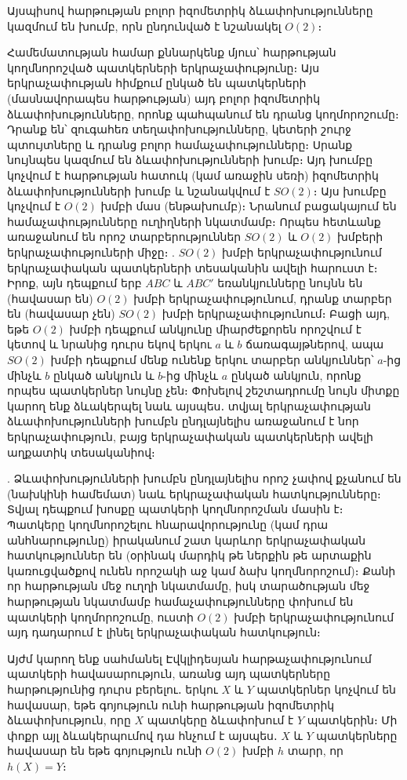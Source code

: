 \documentclass[./main.tex]{subfiles}
\begin{document}
\par Այսպիսով հարթության բոլոր իզոմետրիկ ձևափոխությունները կազմում են խումբ, որն ընդունված է նշանակել $O(2)$։

\par Համեմատության համար քննարկենք մյուս՝ հարթության կողմնորոշված պատկերների երկրաչափությունը։ Այս երկրաչափության
հիմքում ընկած են պատկերների (մասնավորապես հարթության) այդ բոլոր իզոմետրիկ ձևափոխությունները, որոնք պահպանում են դրանց կողմորոշումը։ Դրանք են՝ 
զուգահեռ տեղափոխությունները, կետերի շուրջ պտույտները և դրանց բոլոր համաչափությունները։ Սրանք նույնպես կազմում են ձևափոխությունների խումբ։ 
Այդ խումբը կոչվում է հարթության հատուկ (կամ առաջին սեռի) իզոմետրիկ ձևափոխությունների խումբ և նշանակվում է $SO(2)$։ Այս խումբը կոչվում է $O(2)$ խմբի մաս (ենթախումբ)։ Նրանում բացակայում են համաչափությունները ուղիղների նկատմամբ։ Որպես հետևանք առաջանում են
որոշ տարբերություններ $SO(2)$ և $O(2)$ խմբերի երկրաչափություների միջը։ 
. $SO(2)$ խմբի երկրաչափությունում երկրաչափական պատկերների տեսականին ավելի հարուստ է։ Իրոք, այն դեպքում երբ $ABC$ և $ABC'$ եռանկյունները նույնն են (հավասար են)
$O(2)$ խմբի երկրաչափությունում, դրանք տարբեր են (հավասար չեն) $SO(2)$ խմբի երկրաչափությունում։ Բացի այդ, եթե $O(2)$ խմբի դեպքում անկյունը միարժեքորեն որոշվում է
կետով և նրանից դուրս եկով երկու $a$ և $b$ ճառագայթներով, ապա $SO(2)$ խմբի դեպքում մենք ունենք երկու տարբեր անկյուններ՝ $a$-ից մինչև $b$ ընկած անկյուն և 
$b$-ից մինչև $a$ ընկած անկյուն, որոնք որպես պատկերներ նույնը չեն։ Փոխելով շեշտադրումը նույն միտքը կարող ենք ձևակերպել նաև այսպես․ տվյալ երկրաչափության 
ձևափոխությունների խումբն ընդլայնելիս առաջանում է նոր երկրաչափություն, բայց երկրաչափական պատկերների ավելի աղքատիկ տեսականիով։

. Ձևափոխությունների խումբն ընդլայնելիս որոշ չափով քչանում են (նախկինի համեմատ) նաև երկրաչափական հատկությունները։ Տվյալ դեպքում խոսքը պատկերի 
կողմնորոշման մասին է։ Պատկերը կողմնորոշելու հնարավորությունը (կամ դրա անհնարությունը) իրականում շատ կարևոր երկրաչափական հատկություններ են (օրինակ մարդիկ 
թե ներքին թե արտաքին կառուցվածքով ունեն որոշակի աջ կամ ձախ կողմնորոշում)։ Քանի որ հարթության մեջ ուղղի նկատմամը, իսկ տարածության մեջ հարթության նկատմամբ 
համաչափությունները փոխում են պատկերի կողմորոշումը, ուստի $O(2)$ խմբի երկրաչափությունում այդ դադարում է լինել երկրաչափական հատկություն։  


\par Այժմ կարող ենք սահմանել Էվկլիդեսյան հարթաչափությունում պատկերի հավասարություն, առանց այդ պատկերները 
հարթությունից դուրս բերելու․ երկու $X$ և $Y$ պատկերներ կոչվում են հավասար, եթե գոյություն ունի հարթության իզոմետրիկ ձևափոխություն, որը $X$ պատկերը 
ձևափոխում է $Y$ պատկերին։ Մի փոքր այլ ձևակերպումով դա հնչում է այսպես․ $X$ և $Y$ պատկերները հավասար են եթե գոյություն ունի $O(2)$ խմբի $h$ տարր, որ $h(X) = Y$։
\end{document}
